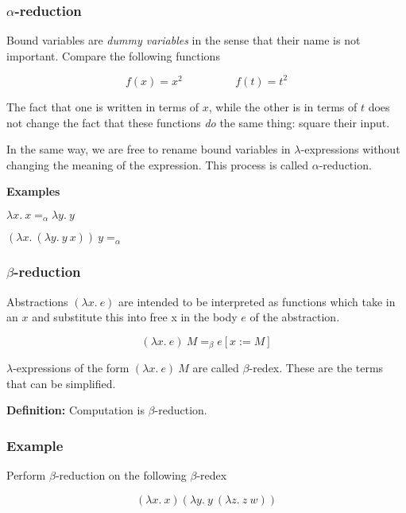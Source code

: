 \documentclass{beamer}
\begin{document}
\begin{frame}
	\frametitle{$\alpha$-reduction}



	Bound variables are \emph{dummy variables} in the sense that their name is not important. Compare the following functions 

	$$f(x) = x^2 \hspace{2cm} f(t) = t^2$$

	The fact that one is written in terms of $x$, while the other is in terms of $t$ does not change the fact that these functions \emph{do} the same thing: square their input. 

	In the same way, we are free to rename bound variables in $\lambda$-expressions without changing the meaning of the expression. This process is called $\alpha$-reduction. 

	{\bf Examples}

	$\lambda x. \ x =_{\alpha} \lambda y. \ y$

	\vspace{0.1cm}

	$(\lambda x. \ (\lambda y. \ y \ x)) \ y =_\alpha$

\end{frame}

\begin{frame}
	\frametitle{$\beta$-reduction}

	Abstractions $(\lambda x. \ e)$ are intended to be interpreted as functions which take in an $x$ and substitute this into free x in the body $e$ of the abstraction. 

	$$(\lambda x. \ e) \ M =_{\beta} e[x:=M]$$

	$\lambda$-expressions of the form $(\lambda x. \ e) \ M$ are called $\beta$-redex. These are the terms that can be simplified.

	\vspace{0.3cm}

	{\bf Definition:} Computation is $\beta$-reduction.
	
\end{frame}

\begin{frame}
	\frametitle{Example}

	Perform $\beta$-reduction on the following $\beta$-redex

	$$(\lambda x. \ x)(\lambda y. \ y \ (\lambda z. \ z \ w))$$

	\vspace{6cm}


\end{frame}
\end{document}
